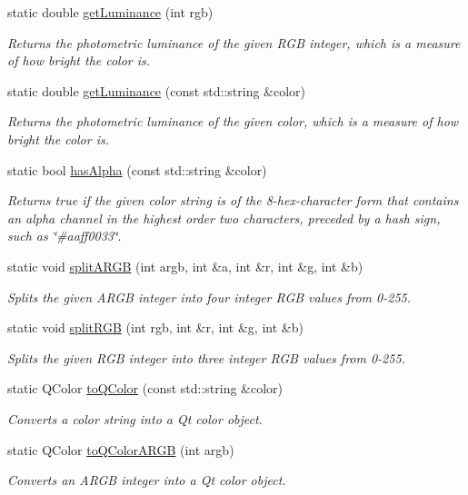 \begin{DoxyCompactItemize}
static double \mbox{\hyperlink{classGColor_abf11afacb5154dec7b8c4ba82ae4cb05}{get\+Luminance}} (int rgb)
\begin{DoxyCompactList}\small\item\em Returns the photometric luminance of the given R\+GB integer, which is a measure of how bright the color is. \end{DoxyCompactList}\item 
static double \mbox{\hyperlink{classGColor_a677f43c53c7f2f5c5294cc23241cc9a7}{get\+Luminance}} (const std\+::string \&color)
\begin{DoxyCompactList}\small\item\em Returns the photometric luminance of the given color, which is a measure of how bright the color is. \end{DoxyCompactList}\item 
static bool \mbox{\hyperlink{classGColor_ac3793cbac78369b75b4d8967d8cb2b7a}{has\+Alpha}} (const std\+::string \&color)
\begin{DoxyCompactList}\small\item\em Returns true if the given color string is of the 8-\/hex-\/character form that contains an alpha channel in the highest order two characters, preceded by a hash sign, such as \char`\"{}\#aaff0033\char`\"{}. \end{DoxyCompactList}\item 
static void \mbox{\hyperlink{classGColor_aa0ad89394f00240bdc0ec3b893eca6aa}{split\+A\+R\+GB}} (int argb, int \&a, int \&r, int \&g, int \&b)
\begin{DoxyCompactList}\small\item\em Splits the given A\+R\+GB integer into four integer R\+GB values from 0-\/255. \end{DoxyCompactList}\item 
static void \mbox{\hyperlink{classGColor_a32dea18e982a160b7b1ce8b4e881c0f9}{split\+R\+GB}} (int rgb, int \&r, int \&g, int \&b)
\begin{DoxyCompactList}\small\item\em Splits the given R\+GB integer into three integer R\+GB values from 0-\/255. \end{DoxyCompactList}\item 
static Q\+Color \mbox{\hyperlink{classGColor_a23f62da01b905b62266904a01cfb3745}{to\+Q\+Color}} (const std\+::string \&color)
\begin{DoxyCompactList}\small\item\em Converts a color string into a Qt color object. \end{DoxyCompactList}\item 
static Q\+Color \mbox{\hyperlink{classGColor_a979586dd4aaf299d42cf19619ee89280}{to\+Q\+Color\+A\+R\+GB}} (int argb)
\begin{DoxyCompactList}\small\item\em Converts an A\+R\+GB integer into a Qt color object. \end{DoxyCompactList}\end{DoxyCompactItemize}
